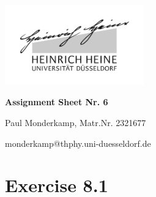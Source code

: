 \documentclass[12pt,a4paper]{article}	%
\begin{document}

\setlength{\parindent}{0pt}


\thispagestyle{empty}

\begin{titlepage}
	\centering
	\includegraphics[width=0.45\textwidth]{logo_sw.jpg}\par\vspace{1cm}
	\vspace{1cm}
	\vspace{1.5cm}
	{\LARGE\bfseries Assignment Sheet Nr. 6\\  \par}
	\vspace{1cm}
	
	{\large	Paul Monderkamp, Matr.Nr. 2321677\par}
	\vfill
	

	\vfill

	{\large  monderkamp@thphy.uni-duesseldorf.de \par}
	\vspace{2cm}
\end{titlepage}

\thispagestyle{empty} %
\newpage	%




\tableofcontents %
\thispagestyle{empty}
\newpage


\section{Exercise 8.1}
\end{document}

